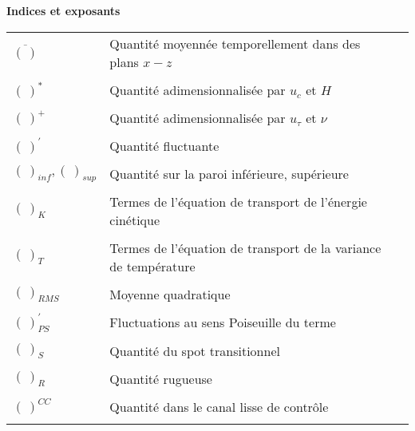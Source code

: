 \clearpage
\noindent \textbf{Indices et exposants}
\vspace{-1.25cm}
\begin{center}
\begin{tabular}{ m{3cm} m{11.5cm} m{1cm} } 
\\
$\overline{(~)}$ & Quantité moyennée temporellement dans des plans $x-z$ &  \\
\\[-2.625em]
$(~)^{*}$ & Quantité adimensionnalisée par $u_{c}$ et $H$ &  \\
\\[-2.625em]
$(~)^{+}$ & Quantité adimensionnalisée par $u_{\tau}$ et $\nu$ &  \\
\\[-2.625em]
$(~)^{'}$ & Quantité fluctuante &  \\
\\[-2.625em]
$(~)_{inf}, (~)_{sup}$ & Quantité sur la paroi inférieure, supérieure &  \\
\\[-2.625em]
$(~)_{K}$ & Termes de l'équation de transport de l'énergie cinétique &  \\
\\[-2.625em]
$(~)_{T}$ & Termes de l'équation de transport de la variance de température &  \\
\\[-2.625em]
$(~)_{RMS}$ & Moyenne quadratique &  \\
\\[-2.625em]
$(~)^{'}_{PS}$ & Fluctuations au sens Poiseuille du terme &  \\
\\[-2.625em]
$(~)_{S}$ & Quantité du spot transitionnel &  \\
\\[-2.625em]
$(~)_{R}$ & Quantité rugueuse &  \\
\\[-2.625em]
$(~)^{CC}$ & Quantité dans le canal lisse de contrôle &  \\
\\[-2.625em]
\end{tabular}
\end{center}
